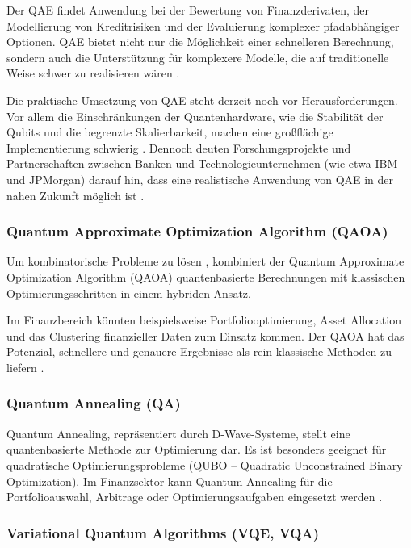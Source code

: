 Der QAE findet Anwendung bei der Bewertung von Finanzderivaten, der Modellierung von Kreditrisiken und der Evaluierung komplexer pfadabhängiger Optionen. QAE bietet nicht nur die Möglichkeit einer schnelleren Berechnung, sondern auch die Unterstützung für komplexere Modelle, die auf traditionelle Weise schwer zu realisieren wären \cite{orus2018,egger2020,rebentrost2018}.

Die praktische Umsetzung von QAE steht derzeit noch vor Herausforderungen. Vor allem die Einschränkungen der Quantenhardware, wie die Stabilität der Qubits und die begrenzte Skalierbarkeit, machen eine großflächige Implementierung schwierig \cite{bouland2020,martin2022}. Dennoch deuten Forschungsprojekte und Partnerschaften zwischen Banken und Technologieunternehmen (wie etwa IBM und JPMorgan) darauf hin, dass eine realistische Anwendung von QAE in der nahen Zukunft möglich ist \cite{egger2020}.

\subsubsection{Quantum Approximate Optimization Algorithm (QAOA)}

Um kombinatorische Probleme zu lösen \cite{orus2019,bouland2020}, kombiniert der Quantum Approximate Optimization Algorithm (QAOA) quantenbasierte Berechnungen mit klassischen Optimierungsschritten in einem hybriden Ansatz.

Im Finanzbereich könnten beispielsweise Portfoliooptimierung, Asset Allocation und das Clustering finanzieller Daten zum Einsatz kommen. Der QAOA hat das Potenzial, schnellere und genauere Ergebnisse als rein klassische Methoden zu liefern \cite{orus2019}.

\subsubsection{Quantum Annealing (QA)}

Quantum Annealing, repräsentiert durch D-Wave-Systeme, stellt eine quantenbasierte Methode zur Optimierung dar. Es ist besonders geeignet für quadratische Optimierungsprobleme (QUBO – Quadratic Unconstrained Binary Optimization). Im Finanzsektor kann Quantum Annealing für die Portfolioauswahl, Arbitrage oder Optimierungsaufgaben eingesetzt werden \cite{orus2019,bouland2020}.

\subsubsection{Variational Quantum Algorithms (VQE, VQA)}

